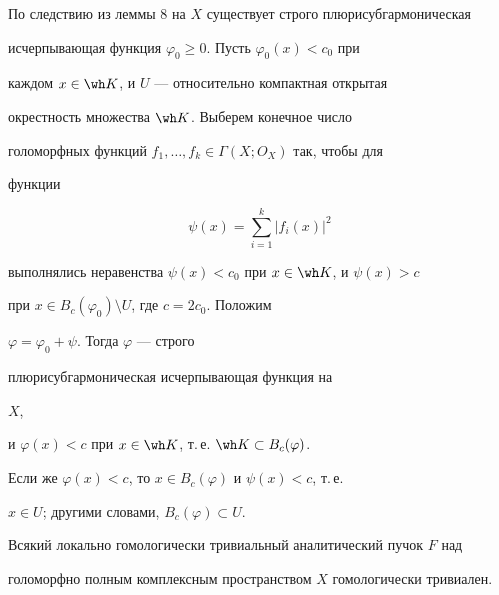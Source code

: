 


\begin{pf} 


По следствию из леммы 8 на $X$ существует строго плюрисубгармоническая 


исчерпывающая функция $\varphi_0\ge 0$. Пусть $\varphi_0(x)<c_0$ при 


каждом $x\in\wh K$, и $U$ --- относительно компактная открытая 


окрестность множества $\wh K$. Выберем конечное число 


голоморфных функций $f_1,\dotsc,f_k\in\Gamma(X;O_X)$ так, чтобы для 


функции 


$$ 


\psi(x)=\sum^k_{i=1}|f_i(x)|^2 


$$ 


выполнялись неравенства $\psi(x)<c_0$ при $x\in\wh K$, и $\psi(x)>c$ 


при $x\in B_c(\varphi_0)\setminus U$, где $c=2c_0$. Положим 


$\varphi=\varphi_0+\psi$. Тогда $\varphi$ --- строго 


плюрисубгармоническая исчерпывающая функция на 


$X$, 


и $\varphi(x)<c$ при $x\in\wh K$, т.\,е.{} $\wh K\subset B_c(\varphi)$. 


Если же $\varphi(x)<c$, то $x\in B_c(\varphi)$ и $\psi(x)<c$, т.\,е.{} 


$x\in U$; другими словами, $B_c(\varphi)\subset U$. 


\end{pf} 


 


\begin{thm} 


Всякий локально гомологически тривиальный аналитический пучок $F$ над 


голоморфно полным комплексным пространством $X$ гомологически тривиален.


\end{thm} 


 



